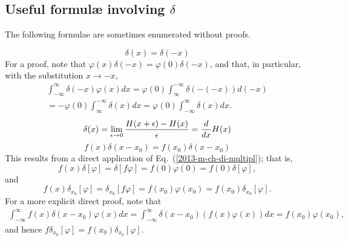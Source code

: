 \subsection{Useful formul\ae{} involving $\delta$}

The following formulae are sometimes enumerated without proofs.


 \begin{equation}
 \delta (x)=\delta (-x)
 \end{equation}
{\color{OliveGreen}
\bproof
For a proof, note that $\varphi (x)\delta (-x) = \varphi (0)\delta (-x)$, and that, in particular,
with the substitution $x \rightarrow -x$,
 \begin{equation}
 \begin{split}
\int _{-\infty}^\infty \delta (-x)  \varphi(x) dx   =
 \varphi(0) \int _\infty ^{-\infty}\delta (-(-x))  d(-x) \\   =
-\varphi(0) \int _\infty ^{-\infty}\delta (x)  d x     =
\varphi(0) \int _{-\infty}^\infty \delta (x)  d x .
 \end{split}
 \end{equation}
\eproof
}
 \begin{equation}
 \delta (x)=\lim_{\epsilon \rightarrow 0}{H (x+\epsilon )
 -H (x)\over \epsilon }={d\over dx}H (x) \end{equation}
 \begin{equation}
 f (x)\delta (x-x_0)
 =
f (x_0)\delta (x-x_0)
 \end{equation}
{\color{OliveGreen}
\bproof
This results from a direct application of Eq.~(\ref{2013-m-ch-di-multipl}); that is,
 \begin{equation}
f(x) \delta
[\varphi ]
=
\delta
\left[  f  \varphi \right]
=
f(0)\varphi(0) = f(0)   \delta
[\varphi ]
,
 \end{equation}
and
 \begin{equation}
f(x) \delta_{x_0}
[\varphi ]
=
\delta_{x_0}
\left[  f  \varphi \right]
=
f({x_0})\varphi({x_0}) = f({x_0})   \delta_{x_0}
[\varphi ]
.
 \end{equation}
For a more explicit direct proof, note that
 \begin{equation}
 \begin{split}
\int _{-\infty}^\infty f (x)\delta (x-x_0)  \varphi(x) dx
=
\int _{-\infty}^\infty\delta (x-x_0)  ( f (x)\varphi(x) ) dx = f(x_0) \varphi(x_0)
,
 \end{split}
 \end{equation}
and hence $f \delta_{x_0}[ \varphi ] =   f(x_0)\delta_{x_0}[ \varphi ]$.
\eproof
}

